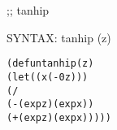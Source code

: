 \begin{aibox}{\function}
;; tanhip

SYNTAX: tanhip (z)  
\end{aibox}

\begin{aibox}{\examples}

\end{aibox}

\begin{aibox}{\comments}

\end{aibox}
\begin{aibox}{\answers}

\end{aibox}
\begin{aibox}{\othercomments}

\end{aibox}
\begin{aibox}{\pseudocode}

\end{aibox}
\begin{aibox}{\code}

\begin{alltt}
(defun tanhip (z)  
    (let ((x (- 0 z)))
        (/ 
            (- (exp z) (exp x))
            (+ (exp z) (exp x)))))

\end{alltt}
\end{aibox}
